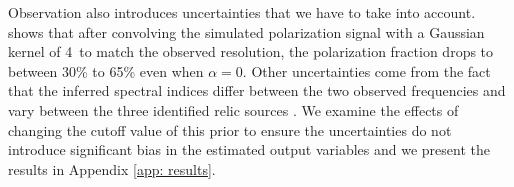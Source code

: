 %
Observation also introduces uncertainties that we have to take into account. \cite{S13} shows that after convolving the
simulated polarization signal with a Gaussian kernel of 4\arcmin~to match
the observed resolution, the polarization fraction drops to between 30\% to
65\% even when $\alpha = 0$. 
Other uncertainties come from the fact that the inferred spectral indices
differ between the two observed frequencies and vary between the three
identified relic sources \citep{L13}. We examine the effects  of changing
the cutoff value of this prior to ensure the uncertainties do not
introduce significant bias in the estimated output variables and we
present the results in Appendix \ref{app: results}. 
%

